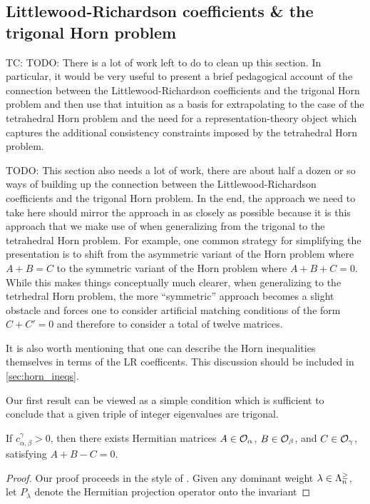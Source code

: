 \documentclass[notitlepage, 10pt]{article}
\begin{document}
\subsection{Littlewood-Richardson coefficients \& the trigonal Horn problem}
\label{sec:LR_coeffs_trigonal}

{\color{red}
    TC: TODO: There is a lot of work left to do to clean up this section.
    In particular, it would be very useful to present a brief pedagogical account of the connection between the Littlewood-Richardson coefficients and the trigonal Horn problem and then use that intuition as a basis for extrapolating to the case of the tetrahedral Horn problem and the need for a representation-theory object which captures the additional consistency constraints imposed by the tetrahedral Horn problem.
}
{\color{red}
    TODO: This section also needs a lot of work, there are about half a dozen or so ways of building up the connection between the Littlewood-Richardson coefficients and the trigonal Horn problem.
    In the end, the approach we need to take here should mirror the approach in \cite{christandl2008quantum} as closely as possible because it is this approach that we make use of when generalizing from the trigonal to the tetrahedral Horn problem.
    For example, one common strategy for simplifying the presentation is to shift from the asymmetric variant of the Horn problem where $A+B=C$ to the symmetric variant of the Horn problem where $A+B+C=0$.
    While this makes things conceptually much clearer, when generalizing to the tetrhedral Horn problem, the more ``symmetric'' approach becomes a slight obstacle and forces one to consider artificial matching conditions of the form $C + C' = 0$ and therefore to consider a total of twelve matrices.

    It is also worth mentioning that one can describe the Horn inequalities themselves in terms of the LR coefficents. This discussion should be included in \cref{sec:horn_ineqs}.
}

Our first result can be viewed as a simple condition which is sufficient to conclude that a given triple of integer eigenvalues are trigonal.
\begin{lem}
    If $c_{\alpha,\beta}^{\gamma} > 0$, then there exists Hermitian matrices $A \in \mathcal O_{\alpha}$, $B \in \mathcal O_{\beta}$, and $C \in \mathcal O_{\gamma}$, satisfying $A + B - C = 0$.
\end{lem}
\begin{proof}
    Our proof proceeds in the style of \cite[Proposition 2.3]{berline2018horn}.
    Given any dominant weight $\lambda \in \Lambda^{\geq}_{n}$, let $P_{\lambda}$ denote the Hermitian projection operator onto the invariant
\end{proof}
\end{document}
